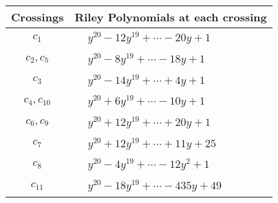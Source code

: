 \documentclass[1p]{elsarticle_modified}
\theoremstyle{definition}
\begin{document}
\begin{tabular}{m{50pt}|m{274pt}}
Crossings & \hspace{64pt}Riley Polynomials at each crossing \\
\hline $$\begin{aligned}c_{1}\end{aligned}$$&$\begin{aligned}
&y^{20}-12 y^{19}+\cdots-20 y+1
\end{aligned}$\\
\hline $$\begin{aligned}c_{2},c_{5}\end{aligned}$$&$\begin{aligned}
&y^{20}-8 y^{19}+\cdots-18 y+1
\end{aligned}$\\
\hline $$\begin{aligned}c_{3}\end{aligned}$$&$\begin{aligned}
&y^{20}-14 y^{19}+\cdots+4 y+1
\end{aligned}$\\
\hline $$\begin{aligned}c_{4},c_{10}\end{aligned}$$&$\begin{aligned}
&y^{20}+6 y^{19}+\cdots-10 y+1
\end{aligned}$\\
\hline $$\begin{aligned}c_{6},c_{9}\end{aligned}$$&$\begin{aligned}
&y^{20}+12 y^{19}+\cdots+20 y+1
\end{aligned}$\\
\hline $$\begin{aligned}c_{7}\end{aligned}$$&$\begin{aligned}
&y^{20}+12 y^{19}+\cdots+11 y+25
\end{aligned}$\\
\hline $$\begin{aligned}c_{8}\end{aligned}$$&$\begin{aligned}
&y^{20}-4 y^{19}+\cdots-12 y^2+1
\end{aligned}$\\
\hline $$\begin{aligned}c_{11}\end{aligned}$$&$\begin{aligned}
&y^{20}-18 y^{19}+\cdots-435 y+49
\end{aligned}$\\
\hline
\end{tabular}\\~\\
\end{document}
